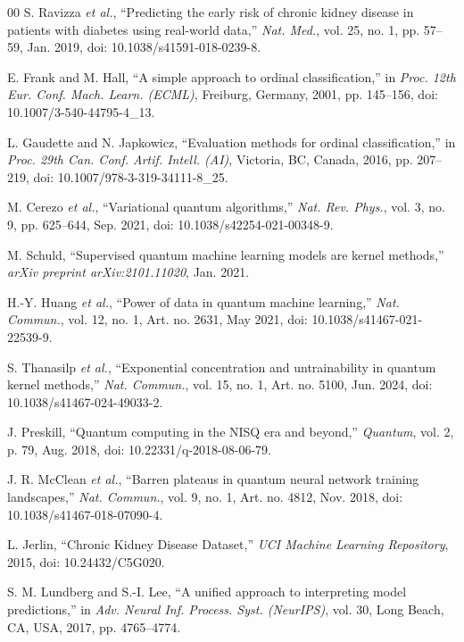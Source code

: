 \documentclass[conference]{IEEEtran}
\begin{document}
{\begin{thebibliography}{00}
S. Ravizza \emph{et al.}, ``Predicting the early risk of chronic kidney disease in patients with diabetes using real-world data,'' \emph{Nat. Med.}, vol. 25, no. 1, pp. 57--59, Jan. 2019, doi: 10.1038/s41591-018-0239-8.

E. Frank and M. Hall, ``A simple approach to ordinal classification,'' in \emph{Proc. 12th Eur. Conf. Mach. Learn. (ECML)}, Freiburg, Germany, 2001, pp. 145--156, doi: 10.1007/3-540-44795-4\_13.

L. Gaudette and N. Japkowicz, ``Evaluation methods for ordinal classification,'' in \emph{Proc. 29th Can. Conf. Artif. Intell. (AI)}, Victoria, BC, Canada, 2016, pp. 207--219, doi: 10.1007/978-3-319-34111-8\_25.

M. Cerezo \emph{et al.}, ``Variational quantum algorithms,'' \emph{Nat. Rev. Phys.}, vol. 3, no. 9, pp. 625--644, Sep. 2021, doi: 10.1038/s42254-021-00348-9.

M. Schuld, ``Supervised quantum machine learning models are kernel methods,'' \emph{arXiv preprint arXiv:2101.11020}, Jan. 2021.

H.-Y. Huang \emph{et al.}, ``Power of data in quantum machine learning,'' \emph{Nat. Commun.}, vol. 12, no. 1, Art. no. 2631, May 2021, doi: 10.1038/s41467-021-22539-9.

S. Thanasilp \emph{et al.}, ``Exponential concentration and untrainability in quantum kernel methods,'' \emph{Nat. Commun.}, vol. 15, no. 1, Art. no. 5100, Jun. 2024, doi: 10.1038/s41467-024-49033-2.

J. Preskill, ``Quantum computing in the NISQ era and beyond,'' \emph{Quantum}, vol. 2, p. 79, Aug. 2018, doi: 10.22331/q-2018-08-06-79.

J. R. McClean \emph{et al.}, ``Barren plateaus in quantum neural network training landscapes,'' \emph{Nat. Commun.}, vol. 9, no. 1, Art. no. 4812, Nov. 2018, doi: 10.1038/s41467-018-07090-4.

L. Jerlin, ``Chronic Kidney Disease Dataset,'' \emph{UCI Machine Learning Repository}, 2015, doi: 10.24432/C5G020.

S. M. Lundberg and S.-I. Lee, ``A unified approach to interpreting model predictions,'' in \emph{Adv. Neural Inf. Process. Syst. (NeurIPS)}, vol. 30, Long Beach, CA, USA, 2017, pp. 4765--4774.


\end{thebibliography}}
\end{document}
